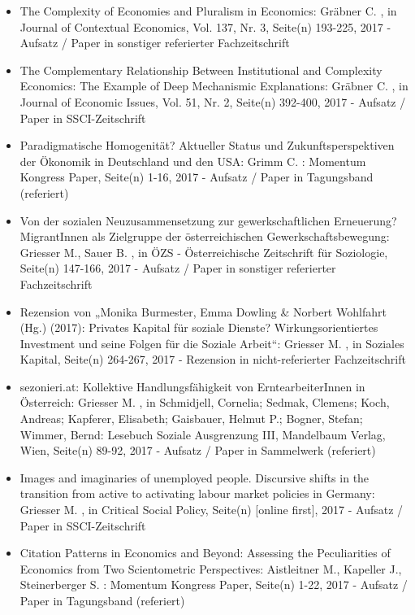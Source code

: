 \begin{itemize}
	 \item The Complexity of Economies and Pluralism in Economics: Gräbner C. , in Journal of Contextual Economics, Vol. 137, Nr. 3, Seite(n) 193-225, 2017 - Aufsatz / Paper in sonstiger referierter Fachzeitschrift
	 \item The Complementary Relationship Between Institutional and Complexity Economics: The Example of Deep Mechanismic Explanations: Gräbner C. , in Journal of Economic Issues, Vol. 51, Nr. 2, Seite(n) 392-400, 2017 - Aufsatz / Paper in SSCI-Zeitschrift
	 \item Paradigmatische Homogenität? Aktueller Status und Zukunftsperspektiven der Ökonomik in Deutschland und den USA: Grimm C. : Momentum Kongress Paper, Seite(n) 1-16, 2017 - Aufsatz / Paper in Tagungsband (referiert)
	 \item Von der sozialen Neuzusammensetzung zur gewerkschaftlichen Erneuerung? MigrantInnen als Zielgruppe der österreichischen Gewerkschaftsbewegung: Griesser M., Sauer B. , in ÖZS - Österreichische Zeitschrift für Soziologie, Seite(n) 147-166, 2017 - Aufsatz / Paper in sonstiger referierter Fachzeitschrift
	 \item Rezension von „Monika Burmester, Emma Dowling & Norbert Wohlfahrt (Hg.) (2017): Privates Kapital für soziale Dienste? Wirkungsorientiertes Investment und seine Folgen für die Soziale Arbeit“: Griesser M. , in Soziales Kapital, Seite(n) 264-267, 2017 - Rezension in nicht-referierter Fachzeitschrift
	 \item sezonieri.at: Kollektive Handlungsfähigkeit von ErntearbeiterInnen in Österreich: Griesser M. , in Schmidjell, Cornelia; Sedmak, Clemens; Koch, Andreas; Kapferer, Elisabeth; Gaisbauer, Helmut P.; Bogner, Stefan; Wimmer, Bernd: Lesebuch Soziale Ausgrenzung III, Mandelbaum Verlag, Wien, Seite(n) 89-92, 2017 - Aufsatz / Paper in Sammelwerk (referiert)
	 \item Images and imaginaries of unemployed people. Discursive shifts in the transition from active to activating labour market policies in Germany: Griesser M. , in Critical Social Policy, Seite(n) [online first], 2017 - Aufsatz / Paper in SSCI-Zeitschrift
	 \item Citation Patterns in Economics and Beyond: Assessing the Peculiarities of Economics from Two Scientometric Perspectives: Aistleitner M., Kapeller J., Steinerberger S. : Momentum Kongress Paper, Seite(n) 1-22, 2017 - Aufsatz / Paper in Tagungsband (referiert)
\end{itemize} 
